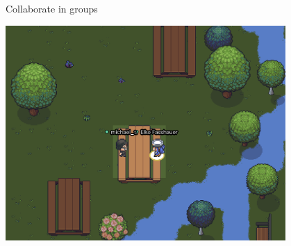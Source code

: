 \begin{frame}{Collaborate in groups}

\begin{center}
 \includegraphics[width=0.8\textwidth]{../02_collab_shared_repo/pics/sit_middle_desk.png}
\end{center}

\end{frame}
